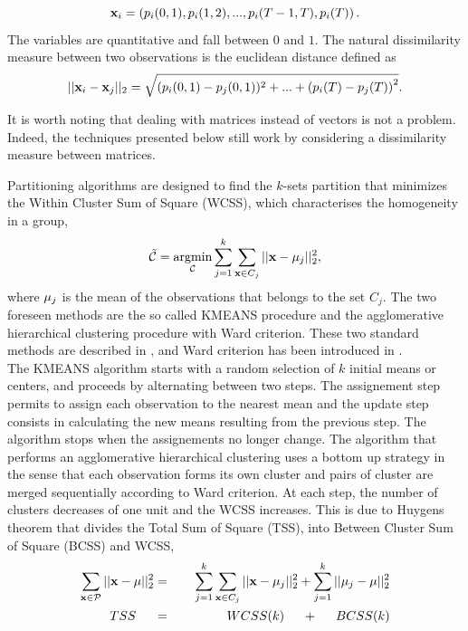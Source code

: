 \begin{equation}\label{SurrenderingProbabilityVector}
\bold{x}_{i}=\left(p_{i}(0,1),p_{i}(1,2),...,p_{i}(T-1,T),p_{i}(T)\right).
\end{equation}    
The variables are quantitative and fall between $0$ and $1$. The natural dissimilarity measure between two observations is the euclidean distance defined as
\begin{equation}\label{EuclideanDistance}
||\bold{x}_{i}-\bold{x}_{j}||_{2}=\sqrt{\left(p_{i}(0,1)-p_{j}(0,1))^{2}+...+(p_{i}(T)-p_{j}(T)\right)^{2}}.
\end{equation}
\begin{Rk}\label{ImpactOfDependencyOnTheMethod}
It is worth noting that dealing with matrices instead of vectors is not a problem. Indeed, the techniques presented below still work by considering a dissimilarity measure between matrices. 
\end{Rk}
Partitioning algorithms are designed to find the $k$-sets partition that minimizes the Within Cluster Sum of Square (WCSS), which characterises the homogeneity in a group,
\begin{equation}
\tilde{\mathcal{C}}=\underset{\mathcal{C}}{\text{argmin}}\sum_{j=1}^{k}\sum_{\bold{x}\in C_{j}}||\bold{x}-\bold{\mu}_{j}||_{2}^{2},
\end{equation}
where $\bold{\mu}_{j}$ is the mean of the observations that belongs to the set $C_{j}$. The two foreseen methods are the so called KMEANS procedure and the agglomerative hierarchical clustering procedure with Ward criterion. These two standard methods are described in \citet{EvLaLe95,Ha75}, and Ward criterion has been introduced in \citet{Wa63}.\\ 
The KMEANS algorithm starts with a random selection of $k$ initial means or centers, and proceeds by alternating between two steps. The assignement step permits to assign each observation to the nearest mean and the update step consists in calculating the new means resulting from the previous step. The algorithm stops when the assignements no longer change. The algorithm that performs an agglomerative hierarchical clustering uses a bottom up strategy in the sense that each observation forms its own cluster and pairs of cluster are merged sequentially according to Ward criterion. At each step, the number of clusters decreases of one unit and the WCSS increases. This is due to Huygens theorem that divides the Total Sum of Square (TSS), into Between Cluster Sum of Square (BCSS) and WCSS,
\begin{eqnarray*}
\sum_{\bold{x}\in\cal{P}}||\bold{x}-\bold{\mu}||_{2}^{2}&=&\sum_{j=1}^{k}\sum_{\bold{x}\in C_{j}}||\bold{x}-\bold{\mu}_{j}||_{2}^{2} + \sum_{j=1}^{k}||\bold{\mu}_{j}-\bold{\mu}||_{2}^{2}\\
TSS\hspace{0.5cm}&=&\hspace{1.3cm}WCSS(k)\hspace{0.5cm}+\hspace{0.5cm}BCSS(k)
\end{eqnarray*}
